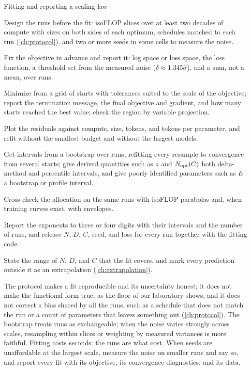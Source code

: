 \begin{refsection}
\begin{protocol}{Fitting and reporting a scaling law}\label{prot:fitting:fit}
\item Design the runs before the fit: isoFLOP slices over at least two decades of compute with sizes on both sides of each optimum, schedules matched to each run (\cref{ch:protocol}), and two or more seeds in some cells to measure the noise.
\item Fix the objective in advance and report it: log space or loss space, the loss function, a threshold set from the measured noise ($\delta\approx1.345\hat\sigma$), and a sum, not a mean, over runs.
\item Minimize from a grid of starts with tolerances suited to the scale of the objective; report the termination message, the final objective and gradient, and how many starts reached the best value; check the region by variable projection.
\item Plot the residuals against compute, size, tokens, and tokens per parameter, and refit without the smallest budget and without the largest models.
\item Get intervals from a bootstrap over runs, refitting every resample to convergence from several starts; give derived quantities such as $a$ and $N_{\mathrm{opt}}(C)$ both delta-method and percentile intervals, and give poorly identified parameters such as $E$ a bootstrap or profile interval.
\item Cross-check the allocation on the same runs with isoFLOP parabolas and, when training curves exist, with envelopes.
\item Report the exponents to three or four digits with their intervals and the number of runs, and release $N$, $D$, $C$, seed, and loss for every run together with the fitting code.
\item State the range of $N$, $D$, and $C$ that the fit covers, and mark every prediction outside it as an extrapolation (\cref{ch:extrapolation}).
\end{protocol}

The protocol makes a fit reproducible and its uncertainty honest; it does not make the functional form true, as the floor of our laboratory shows, and it does not correct a bias shared by all the runs, such as a schedule that does not match the run or a count of parameters that leaves something out (\cref{ch:protocol}). The bootstrap treats runs as exchangeable; when the noise varies strongly across scales, resampling within slices or weighting by measured variances is more faithful. Fitting costs seconds; the runs are what cost. When seeds are unaffordable at the largest scale, measure the noise on smaller runs and say so, and report every fit with its objective, its convergence diagnostics, and its data.


\end{refsection}
